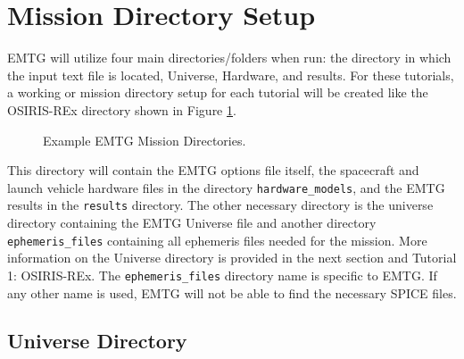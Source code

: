 \documentclass[11pt]{article}
\begin{document}
\section{Mission Directory Setup}
\label{sec:mission_directory_setup}

\ac{EMTG} will utilize four main directories/folders when run: the directory in which the input text file is located, Universe, Hardware, and results. For these tutorials, a working or mission directory setup for each tutorial will be created like the OSIRIS-REx directory shown in Figure \ref{fig:folder_structure}. 

\begin{figure}[H]
	\centering
	\caption{\label{fig:folder_structure}Example \ac{EMTG} Mission Directories.}
\end{figure}

\noindent This directory will contain the \ac{EMTG} options file itself, the spacecraft and launch vehicle hardware files in the directory \texttt{hardware\_models}, and the \ac{EMTG} results in the \texttt{results} directory. The other necessary directory is the universe directory containing the \ac{EMTG} Universe file and another directory \texttt{ephemeris\_files} containing all ephemeris files needed for the mission. More information on the Universe directory is provided in the next section and Tutorial 1: OSIRIS-REx. The \texttt{ephemeris\_files} directory name is specific to \ac{EMTG}. If any other name is used, \ac{EMTG} will not be able to find the necessary \ac{SPICE} files.

\subsection{Universe Directory}
\label{sec:universe_directory}
\end{document}
